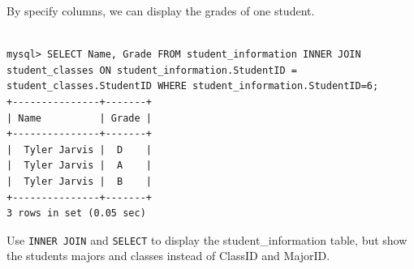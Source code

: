 By specify columns, we can display the grades of one student.

\begin{lstlisting}

mysql> SELECT Name, Grade FROM student_information INNER JOIN student_classes ON student_information.StudentID = student_classes.StudentID WHERE student_information.StudentID=6;
+---------------+-------+
| Name          | Grade |
+---------------+-------+
|  Tyler Jarvis |  D    |
|  Tyler Jarvis |  A    |
|  Tyler Jarvis |  B    |
+---------------+-------+
3 rows in set (0.05 sec)

\end{lstlisting}

\begin{problem}

Use {\tt INNER JOIN} and {\tt SELECT} to display the student\_information table, but show the students majors and classes instead of ClassID and MajorID.

\end{problem}

